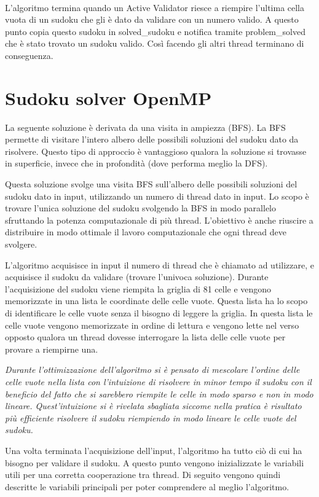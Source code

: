 \documentclass[twoside,twocolumn]{article}
\begin{document}
\\\indent
L'algoritmo termina quando un Active Validator riesce a riempire l'ultima cella vuota di un sudoku che gli è dato da validare con un numero valido. A questo punto copia questo sudoku in solved\_sudoku e notifica tramite problem\_solved che è stato trovato un sudoku valido. Così facendo gli altri thread terminano di conseguenza.


\section{Sudoku solver OpenMP}
La seguente soluzione è derivata da una visita in ampiezza (BFS). La BFS permette di visitare l'intero albero delle possibili soluzioni del sudoku dato da risolvere. Questo tipo di approccio è vantaggioso qualora la soluzione si trovasse in superficie, invece che in profondità (dove performa meglio la DFS).

Questa soluzione svolge una visita BFS sull'albero delle possibili soluzioni del sudoku dato in input, utilizzando un numero di thread dato in input. Lo scopo è trovare l'unica soluzione del sudoku svolgendo la BFS in modo parallelo sfruttando la potenza computazionale di più thread. L'obiettivo è anche riuscire a distribuire in modo ottimale il lavoro computazionale che ogni thread deve svolgere.

L'algoritmo acquisisce in input il numero di thread che è chiamato ad utilizzare, e acquisisce il sudoku da validare (trovare l'univoca soluzione). Durante l'acquisizione del sudoku viene riempita la griglia di 81 celle e vengono memorizzate in una lista le coordinate delle celle vuote. Questa lista ha lo scopo di identificare le celle vuote senza il bisogno di leggere la griglia. In questa lista le celle vuote vengono memorizzate in ordine di lettura e vengono lette nel verso opposto qualora un thread dovesse interrogare la lista delle celle vuote per provare a riempirne una.

{\itshape Durante l'ottimizzazione dell'algoritmo si è pensato di mescolare l'ordine delle celle vuote nella lista con l'intuizione di risolvere in minor tempo il sudoku con il beneficio del fatto che si sarebbero riempite le celle in modo sparso e non in modo lineare. Quest'intuizione si è rivelata sbagliata siccome nella pratica è risultato più efficiente risolvere il sudoku riempiendo in modo lineare le celle vuote del sudoku.}

Una volta terminata l'acquisizione dell'input, l'algoritmo ha tutto ciò di cui ha bisogno per validare il sudoku. A questo punto vengono inizializzate le variabili utili per una corretta cooperazione tra thread. Di seguito vengono quindi descritte le variabili principali per poter comprendere al meglio l'algoritmo.
\end{document}
